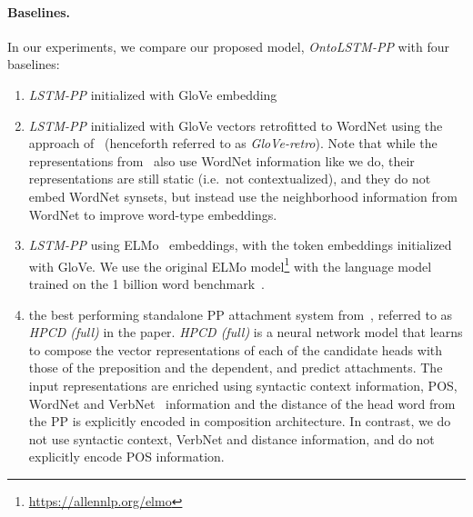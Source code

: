\paragraph{Baselines.} In our experiments, we compare our proposed model,
\textit{OntoLSTM-PP} with four baselines:
\begin{enumerate}
	\item \textit{LSTM-PP} initialized with GloVe embedding
	\item \textit{LSTM-PP} initialized with GloVe vectors retrofitted to
		WordNet using the approach of~\cite{faruqui:15} (henceforth
		referred to as \textit{GloVe-retro}). Note that while the
		representations from~\cite{faruqui:15} also use WordNet
		information like we do, their representations are
		still static (i.e.\ not contextualized), and they do not embed
		WordNet synsets, but instead use the neighborhood information
		from WordNet to improve word-type embeddings.
	\item \textit{LSTM-PP} using ELMo~\citep{Peters:2018} embeddings, with
		the token embeddings initialized with GloVe. We use the original
		ELMo model\footnote{\url{https://allennlp.org/elmo}}
		with the language model trained on the 1 billion word
		benchmark~\citep{chelba2013one}.
	\item the best performing standalone PP attachment system
		from~\cite{belinkov2014exploring}, referred to as \textit{HPCD (full)}
		in the paper. \textit{HPCD (full)} is a neural network
		model that learns to compose the vector representations of each
		of the candidate heads with those of the preposition and the
		dependent, and predict attachments. The input representations
		are enriched using syntactic context information, POS, WordNet
		and VerbNet~\citep{kipper2008large} information and the distance
		of the head word from the PP is explicitly encoded in
		composition architecture. In contrast, we do not use syntactic
		context, VerbNet and distance information, and do not explicitly
		encode POS information.
\end{enumerate}
